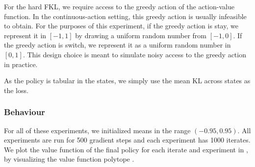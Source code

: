 \documentclass[twoside,11pt]{article}
\begin{document}
For the hard FKL, we require access to the greedy action of the action-value function. In the continuous-action setting, this greedy action is usually infeasible to obtain. For the purposes of this experiment, if the greedy action is stay, we represent it in $[-1, 1]$ by drawing a uniform random number from $[-1, 0]$. If the greedy action is switch, we represent it as a uniform random number in $[0, 1]$. This design choice is meant to simulate noisy access to the greedy action in practice. 

As the policy is tabular in the states, we simply use the mean KL across states as the loss. 

\subsubsection{Behaviour}
For all of these experiments, we initialized means in the range $(-0.95, 0.95)$. All experiments are run for 500 gradient steps and each experiment has 1000 iterates. We plot the value function of the final policy for each iterate and experiment in , by visualizing the value function polytope \citep{dadashi2019value}. 
\end{document}
